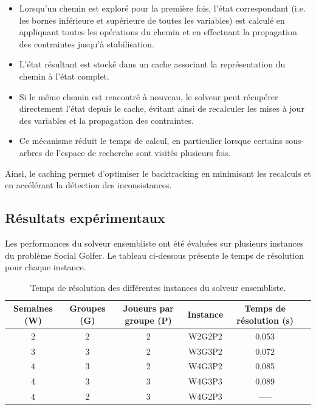 \documentclass{article}
\begin{document}
\begin{itemize}
    \item Lorsqu'un chemin est exploré pour la première fois, l'état correspondant (i.e. les bornes inférieure et supérieure de toutes les variables) est calculé en appliquant toutes les opérations du chemin et en effectuant la propagation des contraintes jusqu'à stabilisation.
    
    \item L'état résultant est stocké dans un cache associant la représentation du chemin à l'état complet. 

    \item Si le même chemin est rencontré à nouveau, le solveur peut récupérer directement l'état depuis le cache, évitant ainsi de recalculer les mises à jour des variables et la propagation des contraintes. 

    \item Ce mécanisme réduit le temps de calcul, en particulier lorsque certains sous-arbres de l'espace de recherche sont visités plusieurs fois.
\end{itemize}

Ainsi, le caching permet d'optimiser le backtracking en minimisant les recalculs et en accélérant la détection des inconsistances.


\subsection{Résultats expérimentaux}

Les performances du solveur ensembliste ont été évaluées sur plusieurs instances du problème Social Golfer. 
Le tableau ci-dessous présente le temps de résolution pour chaque instance.

\begin{table}[H]
\centering
\begin{tabular}{|c|c|c|c|c|c}
\hline
\textbf{Semaines (W)} & \textbf{Groupes (G)} & \textbf{Joueurs par groupe (P)} & \textbf{Instance} & \textbf{Temps de résolution (s)} \\
\hline
2 & 2 & 2 & W2G2P2 & 0,053 \\
\hline
3 & 3 & 2 & W3G3P2 & 0,072 \\
\hline
4 & 3 & 2 & W4G3P2 & 0,085 \\
\hline
4 & 3 & 3 & W4G3P3 & 0,089 \\
\hline
4 & 2 & 3 & W4G2P3 & ----- \\
\hline
\end{tabular}
\caption{Temps de résolution des différentes instances du solveur ensembliste.}
\label{tab:resultats}
\end{table}
\end{document}
